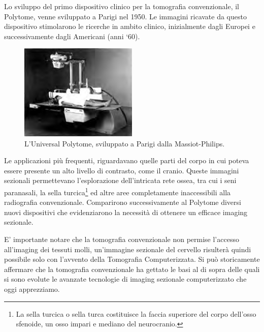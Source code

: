 \documentclass[a4paper,12pt, doubleside]{report}
\begin{document}
                \par
                    Lo sviluppo del primo dispositivo clinico per la tomografia convenzionale, il Polytome, venne sviluppato a Parigi nel 1950. Le immagini ricavate da questo dispositivo stimolarono le ricerche in ambito clinico, inizialmente dagli Europei e successivamente dagli Americani (anni ‘60).
                            
                    \begin{figure}[h]
                        \centering
                        \includegraphics[width=0.5\textwidth]{polytome}
                        \caption{L'Universal Polytome, sviluppato a Parigi dalla Massiot-Philips.}
                        \label{fig:polytome}
                    \end{figure}
                        
                            
                    Le applicazioni più frequenti, riguardavano quelle parti del corpo in cui poteva essere presente un alto livello di contrasto, come il cranio. Queste immagini sezionali permettevano l’esplorazione dell’intricata rete ossea, tra cui i seni paranasali, la sella turcica\footnote{La sella turcica o sella turca costituisce la faccia superiore del corpo dell'osso sfenoide, un osso impari e mediano del neurocranio.} ed altre aree completamente inaccessibili alla radiografia convenzionale. Comparirono successivamente al Polytome diversi nuovi dispositivi che evidenziarono la necessità di ottenere un efficace imaging sezionale.
                \par
                    E’ importante notare che la tomografia convenzionale non permise l’accesso all’imaging dei tessuti molli, un’immagine sezionale del cervello risulterà quindi possibile solo con l’avvento della Tomografia Computerizzata. Si può storicamente affermare che la tomografia convenzionale ha gettato le basi al di sopra delle quali si sono evolute le avanzate tecnologie di imaging sezionale computerizzato che oggi apprezziamo.
                        
\end{document}
